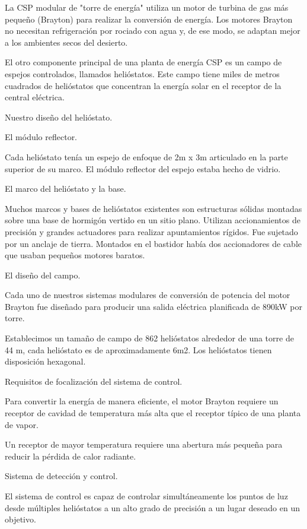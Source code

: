 La CSP modular de "torre de energía" utiliza un motor de turbina de gas más pequeño (Brayton) para realizar la conversión de energía. Los motores Brayton no necesitan refrigeración por rociado con agua y, de ese modo, se adaptan mejor a los ambientes secos del desierto.

El otro componente principal de una planta de energía CSP es un campo de espejos controlados, llamados helióstatos. Este campo tiene miles de metros cuadrados de helióstatos que concentran la energía solar en el receptor de la central eléctrica.

Nuestro diseño del helióstato.

El módulo reflector.

Cada helióstato tenía un espejo de enfoque de 2m x 3m articulado en la parte superior de su marco. El módulo reflector del espejo estaba hecho de vidrio.

El marco del helióstato y la base.

Muchos marcos y bases de helióstatos existentes son estructuras sólidas montadas sobre una base de hormigón vertido en un sitio plano. Utilizan accionamientos de precisión y grandes actuadores para realizar apuntamientos rígidos. Fue sujetado por un anclaje de tierra. Montados en el bastidor había dos accionadores de cable que usaban pequeños motores baratos.

El diseño del campo.

Cada uno de nuestros sistemas modulares de conversión de potencia del motor Brayton fue diseñado para producir una salida eléctrica planificada de 890kW por torre.

Establecimos un tamaño de campo de 862 helióstatos alrededor de una torre de 44 m, cada helióstato es de aproximadamente 6m2. Los helióstatos tienen disposición hexagonal.

Requisitos de focalización del sistema de control.

Para convertir la energía de manera eficiente, el motor Brayton requiere un receptor de cavidad de temperatura más alta que el receptor típico de una planta de vapor.

Un receptor de mayor temperatura requiere una abertura más pequeña para reducir la pérdida de calor radiante.

Sistema de detección y control.

El sistema de control es capaz de controlar simultáneamente los puntos de luz desde múltiples helióstatos a un alto grado de precisión a un lugar deseado en un objetivo.

